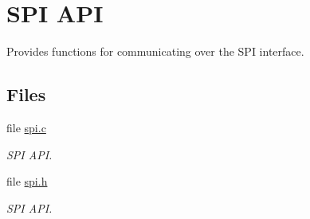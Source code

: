\hypertarget{group___s_p_i}{\section{S\-P\-I A\-P\-I}
\label{group___s_p_i}
}


Provides functions for communicating over the S\-P\-I interface.  


\subsection*{Files}
\begin{DoxyCompactItemize}
\item 
file \hyperlink{spi_8c}{spi.\-c}
\begin{DoxyCompactList}\small\item\em S\-P\-I A\-P\-I. \end{DoxyCompactList}\item 
file \hyperlink{spi_8h}{spi.\-h}
\begin{DoxyCompactList}\small\item\em S\-P\-I A\-P\-I. \end{DoxyCompactList}\end{DoxyCompactItemize}
